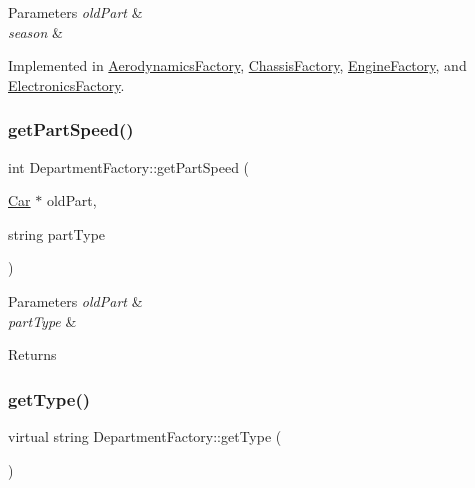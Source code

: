 \begin{DoxyParams}{Parameters}
{\em old\+Part} & \\
\hline
{\em season} & \\
\hline
\end{DoxyParams}


Implemented in \hyperlink{classAerodynamicsFactory_a2c6e6ce04d21da014e3c0c6affe423ae}{Aerodynamics\+Factory}, \hyperlink{classChassisFactory_aeeb7d210e8c3ca1a3e3b2998705b0d90}{Chassis\+Factory}, \hyperlink{classEngineFactory_af8c2f4bf420b5d2f0742b3d38746cf40}{Engine\+Factory}, and \hyperlink{classElectronicsFactory_a6489d0e612615f65d76620585a67ff38}{Electronics\+Factory}.

\mbox{\label{classDepartmentFactory_a9a7fa0ea7860d17be0f3ef095d28a24e}} 
\subsubsection{\texorpdfstring{get\+Part\+Speed()}{getPartSpeed()}}
{\footnotesize\ttfamily int Department\+Factory\+::get\+Part\+Speed (\begin{DoxyParamCaption}\item[{\hyperlink{classCar}{Car} $\ast$}]{old\+Part,  }\item[{string}]{part\+Type }\end{DoxyParamCaption})}


\begin{DoxyParams}{Parameters}
{\em old\+Part} & \\
\hline
{\em part\+Type} & \\
\hline
\end{DoxyParams}
\begin{DoxyReturn}{Returns}

\end{DoxyReturn}
\mbox{\label{classDepartmentFactory_a5aac775b89c4c390ad885e1de8947b0d}} 
\subsubsection{\texorpdfstring{get\+Type()}{getType()}}
{\footnotesize\ttfamily virtual string Department\+Factory\+::get\+Type (\begin{DoxyParamCaption}{ }\end{DoxyParamCaption})\hspace{0.3cm}{\ttfamily [pure virtual]}}

